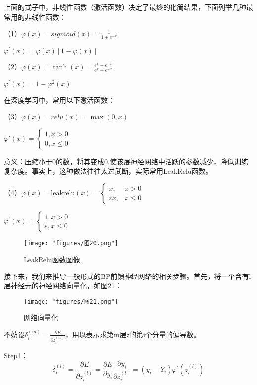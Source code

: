 上面的式子中，非线性函数（激活函数）决定了最终的化简结果，下面列举几种最常用的非线性函数：

（1）$\varphi(x)=sigmoid(x)=\frac1{1+e^{-x}}$

$\varphi^\prime(x)=\varphi(x)[1-\varphi(x)]$

（2）$\varphi(x)=\tanh(x)=\frac{e^x-e^{-x}}{e^x+e^{-x}}$

$\varphi^{\prime}(x)=1-\varphi^2(x)$

在深度学习中，常用以下激活函数：

（3）$\varphi(x)=relu(x)=\max(0,x)$

$\varphi'(x)=\begin{cases}1,x>0\\0,x\leq0\end{cases}$

意义：压缩小于0的数，将其变成0.使该层神经网络中活跃的参数减少，降低训练复杂度。事实上，这种做法往往太过武断，实际常用LeakRelu函数。

（4）$\varphi(x) = \text{leakrelu}(x) = 
\begin{cases} 
	x, & x > 0 \\
	\varepsilon x, & x \leq 0 
\end{cases}$

$\varphi^{\prime}(x)=\begin{cases}1,x>0\\\varepsilon,x\leq0\end{cases}$

\begin{figure}[ht] %
	\centering
	\texttt{[image: "figures/图20.png"]} %
	\caption{LeakRelu函数图像} %
	\label{fig:example} %
\end{figure}

接下来，我们来推导一般形式的BP前馈神经网络的相关步骤。首先，将一个含有l层神经元的神经网络向量化，如图21：

\begin{figure}[ht] %
	\centering
	\texttt{[image: "figures/图21.png"]} %
	\caption{网络向量化} %
	\label{fig:example} %
\end{figure}

不妨设$\delta_{i}^{(m)}=\frac{\partial E}{\partial z_{i}^{(m)}}$，用以表示求第m层z的第i个分量的偏导数。

Step1：
\begin{equation}\delta_i^{(l)}=\frac{\partial E}{\partial z_i^{(l)}}=\frac{\partial E}{\partial y_i}\frac{\partial y_i}{\partial z_i^{(l)}}=(y_i-Y_i)\varphi^{\prime}(z_i^{(l)}) \end{equation}

